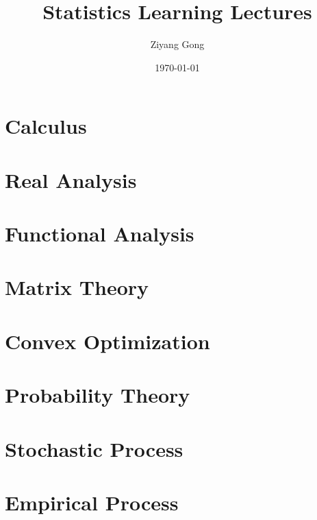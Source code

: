 \documentclass[12pt]{prettybook}
\title{Statistics Learning Lectures}
\author{Ziyang Gong}
\date{\today}
\begin{document}
\frontmatter
\tableofcontents

\mainmatter
\part{Calculus}



\part{Real Analysis}


\part{Functional Analysis}
\part{Matrix Theory}



\part{Convex Optimization}





\part{Probability Theory}






\part{Stochastic Process}




\part{Empirical Process}


\end{document}
